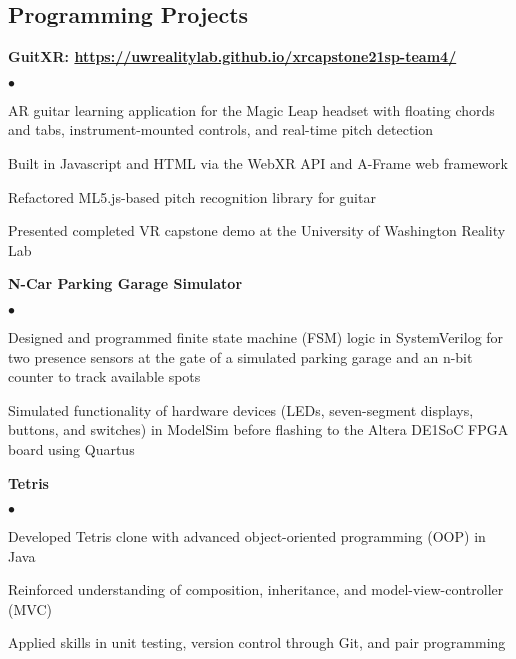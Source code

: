 \documentclass[margin,line]{res}
\newenvironment{list2}{
  \begin{list}{$\bullet$}{%
      \setlength{\itemsep}{0in}
      \setlength{\parsep}{0in} \setlength{\parskip}{0in}
      \setlength{\topsep}{0in} \setlength{\partopsep}{0in} 
      \setlength{\leftmargin}{0.2in}}}{\end{list}}
\begin{document}
\begin{resume}
\section{\sc Programming Projects}


{\bf GuitXR: \url{https://uwrealitylab.github.io/xrcapstone21sp-team4/}} %
\begin{list2}
\item AR guitar learning application for the Magic Leap headset with floating chords and tabs, instrument-mounted controls, and real-time pitch detection
\item Built in Javascript and HTML via the WebXR API and A-Frame web framework
\item Refactored ML5.js-based pitch recognition library for guitar 
\item Presented completed VR capstone demo at the University of Washington Reality Lab
\end{list2}

{\bf N-Car Parking Garage Simulator}
\begin{list2}
\item Designed and programmed finite state machine (FSM) logic in SystemVerilog for two presence sensors at the gate of a simulated parking garage and an n-bit counter to track available spots
\item Simulated functionality of hardware devices (LEDs, seven-segment displays, buttons, and switches) in ModelSim before flashing to the Altera DE1{\textunderscore}SoC FPGA board using Quartus
\end{list2}


{\bf Tetris} %
\begin{list2}
\item Developed Tetris clone with advanced object-oriented programming (OOP) in Java
\item Reinforced understanding of composition, inheritance, and model-view-controller (MVC)
\item Applied skills in unit testing, version control through Git, and pair programming
\end{list2}


\end{resume}
\end{document}
